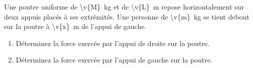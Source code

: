 Une poutre uniforme de \qty{\v{M}}{kg} et de \qty{\v{L}}{m} repose horizontalement sur deux appuis placés à ses extrémités. Une personne de \qty{\v{m}}{kg} se tient debout sur la poutre à \qty{\v{x}}{m} de l'appui de gauche.

\begin{center}
\end{center}

\begin{enumerate}[label=\alph*)]
    \item Déterminez la force exercée par l'appui de droite sur la poutre.
    \item Déterminez la force exercée par l'appui de gauche sur la poutre.
\end{enumerate}
